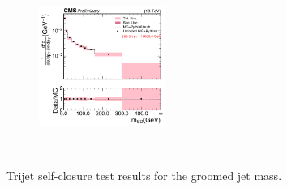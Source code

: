 \begin{figure}[htp!]
\begin{subfigure}
          \centering
          \includegraphics[width=0.45\textwidth]{figures/multijet/unfolding/trijet/closure_binnedResult_groomed_3.pdf}
        \end{subfigure} \\
	\caption{Trijet self-closure test results for the groomed jet mass.}
	\label{fig:trijetclosurebinned_g}
      \end{figure}

